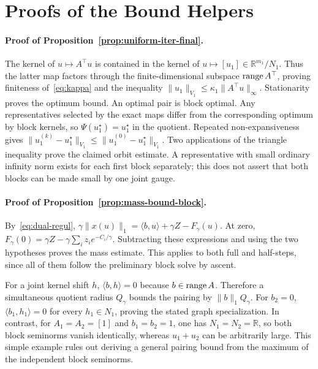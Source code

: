 \section{Proofs of the Bound Helpers}\label{app-app:primaldual-proofs}
\paragraph{Proof of Proposition~\ref{prop:uniform-iter-final}.}
The kernel of $u\mapsto A^\top u$ is contained in the kernel of $u\mapsto[u_1]\in\mathbb R^{m_1}/N_1$. Thus the latter map factors through the finite-dimensional subspace $\operatorname{range} A^\top$, proving finiteness of~\eqref{eq:kappa} and the inequality $\|u_1\|_{V_1}\leq\kappa_1\|A^\top u\|_\infty$. Stationarity proves the optimum bound. An optimal pair is block optimal. Any representatives selected by the exact maps differ from the corresponding optimum by block kernels, so $\Psi(u_1^\star)=u_1^\star$ in the quotient. Repeated non-expansiveness gives
$\|u_1^{(k)}-u_1^\star\|_{V_1}\leq\|u_1^{(0)}-u_1^\star\|_{V_1}$. Two applications of the triangle inequality prove the claimed orbit estimate. A representative with small ordinary infinity norm exists for each first block separately; this does not assert that both blocks can be made small by one joint gauge.

\paragraph{Proof of Proposition~\ref{prop:mass-bound-block}.}
By~\eqref{eq:dual-regul},
$\gamma\|x(u)\|_1=\langle b,u\rangle+\gamma Z-F_\gamma(u)$.
At zero, $F_\gamma(0)=\gamma Z-\gamma\sum_i z_i e^{-C_i/\gamma}$. Subtracting these expressions and using the two hypotheses proves the mass estimate. This applies to both full and half-steps, since all of them follow the preliminary block solve by ascent.

For a joint kernel shift $h$, $\langle b,h\rangle=0$ because $b\in\operatorname{range} A$. Therefore a simultaneous quotient radius $Q_\gamma$ bounds the pairing by $\|b\|_1Q_\gamma$. For $b_2=0$, $\langle b_1,h_1\rangle=0$ for every $h_1\in N_1$, proving the stated graph specialization. In contrast, for $A_1=A_2=[1]$ and $b_1=b_2=1$, one has $N_1=N_2=\mathbb R$, so both block seminorms vanish identically, whereas $u_1+u_2$ can be arbitrarily large. This simple example rules out deriving a general pairing bound from the maximum of the independent block seminorms.
